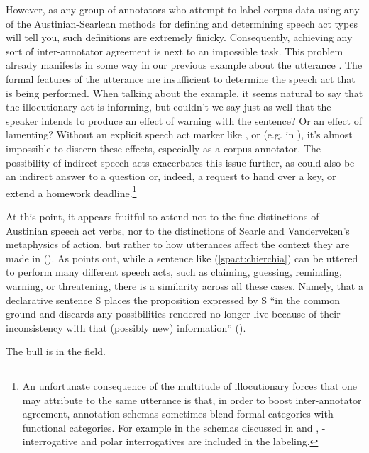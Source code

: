 However, as any group of annotators who attempt to label corpus data using any of the Austinian-Searlean methods for defining and determining speech act types will tell you, such definitions are extremely finicky. Consequently, achieving any sort of inter-annotator agreement is next to an impossible task. This problem already manifests in some way in our previous example about the utterance . The formal features of the utterance are insufficient to determine the speech act that is being performed. When talking about the example, it seems natural to say that the illocutionary act is informing, but couldn’t we say just as well that the speaker intends to produce an effect of warning with the sentence? Or an effect of lamenting? Without an explicit speech act marker like ,  or  (e.g. in ), it’s almost impossible to discern these effects, especially as a corpus annotator. The possibility of indirect speech acts exacerbates this issue further, as  could also be an indirect answer to a question or, indeed, a request to hand over a key, or extend a homework deadline.\footnote{An unfortunate consequence of the multitude of illocutionary forces that one may attribute to the same utterance is that, in order to boost inter-annotator agreement, annotation schemas sometimes blend formal categories with functional categories. For example in the schemas discussed in \textcite{ninio1994} and \textcite{dialogact}, \twh-interrogative and polar interrogatives are included in the labeling.}

At this point, it appears fruitful to attend not to the fine distinctions of Austinian speech act verbs, nor to the distinctions of Searle and Vanderveken’s metaphysics of action, but rather to how utterances affect the context they are made in (\cite{hamblin1971, stalnaker1978, lewis1979scorekeeping, gazdar1981speech}). As \textcite{chierchia1990textbook} points out, while a sentence like (\ref{spact:chierchia}) can be uttered to perform many different speech acts, such as claiming, guessing, reminding, warning, or threatening, there is a similarity across all these cases. Namely, that a declarative sentence S places the proposition expressed by S “in the common ground and discards any possibilities rendered no longer live because of their inconsistency with that (possibly new) information” (\cite[p.171]{ chierchia1990textbook}). 

The bull is in the field.
\eex

